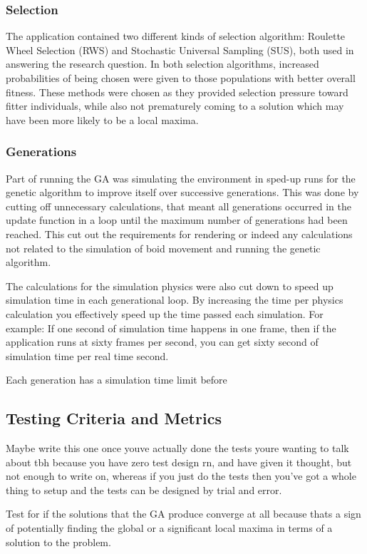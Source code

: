 \subsubsection{Selection}
The application contained two different kinds of selection algorithm: Roulette Wheel Selection (RWS) and Stochastic Universal Sampling (SUS), both used in answering the research question. In both selection algorithms, increased probabilities of being chosen were given to those populations with better overall fitness. These methods were chosen as they provided selection pressure toward fitter individuals, while also not prematurely coming to a solution which may have been more likely to be a local maxima. 


\subsubsection{Generations}
Part of running the GA was simulating the environment in sped-up runs for the genetic algorithm to improve itself over successive generations. This was done by cutting off unnecessary calculations, that meant all generations occurred in the update function in a loop until the maximum number of generations had been reached. This cut out the requirements for rendering or indeed any calculations not related to the simulation of boid movement and running the genetic algorithm.

The calculations for the simulation physics were also cut down to speed up simulation time in each generational loop. By increasing the time per physics calculation you effectively speed up the time passed each simulation. For example: If one second of simulation time happens in one frame, then if the application runs at sixty frames per second, you can get sixty second of simulation time per real time second.

Each generation has a simulation time limit before



\subsection{Testing Criteria and Metrics}
Maybe write this one once youve actually done the tests youre wanting to talk about tbh because you have zero test design rn, and have given it thought, but not enough to write on, whereas if you just do the tests then you've got a whole thing to setup and the tests can be designed by trial and error. 

Test for if the solutions that the GA produce converge at all because thats a sign of potentially finding the global or a significant local maxima in terms of a solution to the problem.
















